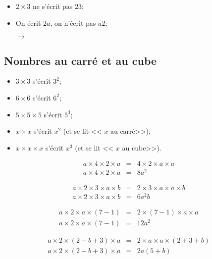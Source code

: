 \documentclass[12pt,a4paper]{article}
\begin{document}
\begin{mywarning}
	
	\begin{itemize}
		\item $2 \times 3$ ne s'écrit pas $23$;
		\item On écrit $2a$, on n'écrit pas $a2$;
		\item[$\rightarrow$]  
	\end{itemize}
\end{mywarning}


\subsection{Nombres au carré et au cube}

\begin{mymeth}
	
	\begin{itemize}
		\item $3 \times 3$ s'écrit $3^2$;
		\item $6 \times 6$ s'écrit $6^2$;
		\item $5 \times 5 \times 5$ s'écrit $5^3$;
	\end{itemize}
	
	\vspace*{0.25cm}
	
	\begin{itemize}
		
		\item $x \times x$ s'écrit $x^2$ (et se lit << $x$ au carré>>);
		\item $x \times x \times x$ s'écrit $x^3$ (et se lit << $x$ au cube>>).
	\end{itemize}
\end{mymeth}

\begin{myexs}
	\begin{eqnarray*}
		a \times 4 \times 2 \times a &=& 4 \times 2 \times  a \times a \\
		a \times 4 \times 2 \times a &=& 8a^2
	\end{eqnarray*}
	
	\begin{eqnarray*}
		a \times 2 \times 3 \times a \times b &=& 2 \times 3 \times a \times a \times b\\
		a \times 2 \times 3 \times a \times b &=& 6a^2b
	\end{eqnarray*}
	
	
	\begin{eqnarray*}
		a \times 2 \times a \times (7 - 1) &=& 2 \times (7 - 1) \times a \times a\\
		a \times 2 \times a \times (7 - 1) &=& 12a^2
	\end{eqnarray*}


	\begin{eqnarray*}
		a \times 2 \times (2 + b + 3) \times a &=& 2 \times a \times a \times (2 + 3 + b)\\
		a \times 2 \times (2 + b + 3) \times a &=& 2a(5+b)
	\end{eqnarray*}
\end{myexs}
\end{document}
